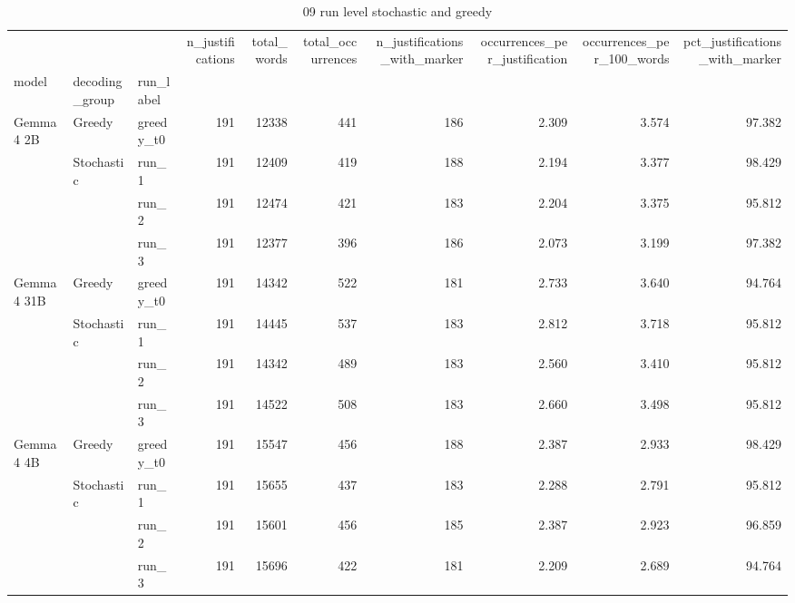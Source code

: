 \begin{table}
\caption{09 run level stochastic and greedy}
\begin{tabular}{lllrrrrrrr}
\toprule
 &  &  & n\_justifications & total\_words & total\_occurrences & n\_justifications\_with\_marker & occurrences\_per\_justification & occurrences\_per\_100\_words & pct\_justifications\_with\_marker \\
model & decoding_group & run_label &  &  &  &  &  &  &  \\
\midrule
\multirow[t]{4}{*}{Gemma 4 2B} & Greedy & greedy\_t0 & 191 & 12338 & 441 & 186 & 2.309 & 3.574 & 97.382 \\
\cline{2-10}
 & \multirow[t]{3}{*}{Stochastic} & run\_1 & 191 & 12409 & 419 & 188 & 2.194 & 3.377 & 98.429 \\
 &  & run\_2 & 191 & 12474 & 421 & 183 & 2.204 & 3.375 & 95.812 \\
 &  & run\_3 & 191 & 12377 & 396 & 186 & 2.073 & 3.199 & 97.382 \\
\cline{1-10} \cline{2-10}
\multirow[t]{4}{*}{Gemma 4 31B} & Greedy & greedy\_t0 & 191 & 14342 & 522 & 181 & 2.733 & 3.640 & 94.764 \\
\cline{2-10}
 & \multirow[t]{3}{*}{Stochastic} & run\_1 & 191 & 14445 & 537 & 183 & 2.812 & 3.718 & 95.812 \\
 &  & run\_2 & 191 & 14342 & 489 & 183 & 2.560 & 3.410 & 95.812 \\
 &  & run\_3 & 191 & 14522 & 508 & 183 & 2.660 & 3.498 & 95.812 \\
\cline{1-10} \cline{2-10}
\multirow[t]{4}{*}{Gemma 4 4B} & Greedy & greedy\_t0 & 191 & 15547 & 456 & 188 & 2.387 & 2.933 & 98.429 \\
\cline{2-10}
 & \multirow[t]{3}{*}{Stochastic} & run\_1 & 191 & 15655 & 437 & 183 & 2.288 & 2.791 & 95.812 \\
 &  & run\_2 & 191 & 15601 & 456 & 185 & 2.387 & 2.923 & 96.859 \\
 &  & run\_3 & 191 & 15696 & 422 & 181 & 2.209 & 2.689 & 94.764 \\
\cline{1-10} \cline{2-10}
\bottomrule
\end{tabular}
\end{table}
